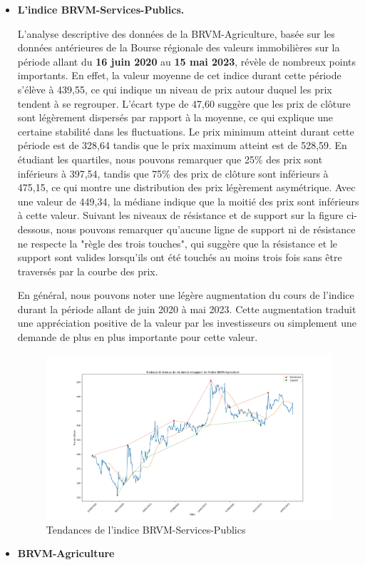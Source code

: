 \begin{itemize}
\item
  \textbf{L'indice BRVM-Services-Publics.}

  {L'analyse descriptive des données de la BRVM-Agriculture, basée sur
  les données antérieures de la Bourse régionale des valeurs
  immobilières sur la période allant du \textbf{16 juin 2020} au
  \textbf{15 mai 2023}, révèle de nombreux points importants. En effet,
  la valeur moyenne de cet indice durant cette période s'élève à 439,55,
  ce qui indique un niveau de prix autour duquel les prix tendent à se
  regrouper. L'écart type de 47,60 suggère que les prix de clôture sont
  légèrement dispersés par rapport à la moyenne, ce qui explique une
  certaine stabilité dans les fluctuations. Le prix minimum atteint
  durant cette période est de 328,64 tandis que le prix maximum atteint
  est de 528,59. En étudiant les quartiles, nous pouvons remarquer que
  25\% des prix sont inférieurs à 397,54, tandis que 75\% des prix de
  clôture sont inférieurs à 475,15, ce qui montre une distribution des
  prix légèrement asymétrique. Avec une valeur de 449,34, la médiane
  indique que la moitié des prix sont inférieurs à cette valeur. Suivant
  les niveaux de résistance et de support sur la figure ci-dessous, nous
  pouvons remarquer qu'aucune ligne de support ni de résistance ne
  respecte la "règle des trois touches", qui suggère que la résistance
  et le support sont valides lorsqu'ils ont été touchés au moins trois
  fois sans être traversés par la courbe des prix.}

  { En général, nous pouvons noter une légère augmentation du cours de
  l'indice durant la période allant de juin 2020 à mai 2023. Cette
  augmentation traduit une appréciation positive de la valeur par les
  investisseurs ou simplement une demande de plus en plus importante
  pour cette valeur.}

  \begin{figure}
  \hypertarget{fig:Tendancesux20deux20lux27indiceux20BRVM-Services-Publics}{%
  \centering
  \includegraphics{img/public_tendance.jpg}
  \caption{Tendances de l'indice
  BRVM-Services-Publics}\label{fig:Tendancesux20deux20lux27indiceux20BRVM-Services-Publics}
  }
  \end{figure}
\item
  \textbf{BRVM-Agriculture}


\end{itemize}
